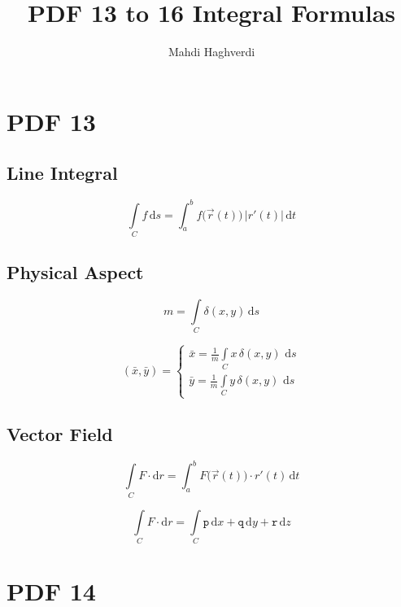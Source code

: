 \documentclass[12pt, fleqn]{book}
\title{PDF 13 to 16 Integral Formulas}
\author{Mahdi Haghverdi}
\begin{document}
	\maketitle
	\tableofcontents
	
\chapter{PDF 13}\label{pdf13}
	\section{Line Integral}
	\begin{equation}
		\int\limits_C f \, \mathrm{d}s = \int_{a}^{b} f\big(\vec{r}(t)\big) \, \lvert r'(t) \lvert \, \mathrm{d}t
	\end{equation}		

	\section{Physical Aspect}
		\begin{equation}
			m = \int\limits_C \delta (x, y) \, \mathrm{d}s
		\end{equation}
		
		\begin{equation}
			(\bar{x}, \bar{y}) = 
			\begin{cases}
					\bar{x} = \frac{1}{m} \int\limits_C x \, \delta(x, y) \, \, \mathrm{d}s \\
					\bar{y} = \frac{1}{m} \int\limits_C y \, \delta(x, y) \, \, \mathrm{d}s
			\end{cases}
		\end{equation}
	
	\section{Vector Field}
		\begin{equation}
			\int\limits_C F \cdot \mathrm{d}r = \int_{a}^{b} F\big(\vec{r}(t)\big) \cdot r'(t) \, \mathrm{d}t
		\end{equation}
		
		\begin{equation}
			\int\limits_C F \cdot \mathrm{d}r = \int\limits_C \mathtt{p} \, \mathrm{d}x + \mathtt{q} \, \mathrm{d}y + \mathtt{r} \, \mathrm{d}z
		\end{equation}    

\chapter{PDF 14}\label{pdf14}
\end{document}
